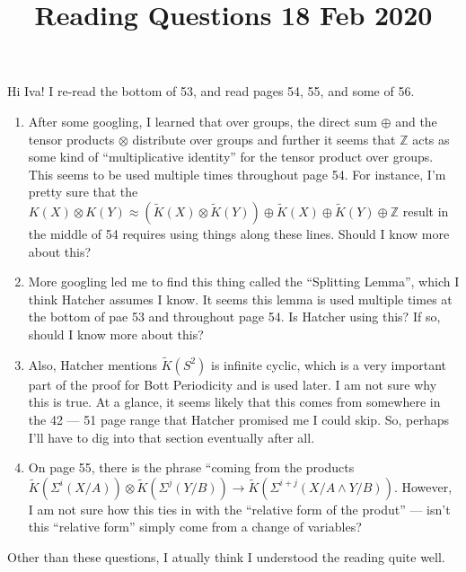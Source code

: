 \documentclass[12]{amsart}
\newcommand{\op}[0]{\oplus}
\newcommand{\ot}[0]{\otimes}
\newcommand{\RK}[0]{\tilde{K}}
\newcommand{\Z}[0]{\mathbb{Z}}
\newcommand{\ismt}[0]{\approx}
\begin{document}
\title{Reading Questions 18 Feb 2020}
\maketitle

Hi Iva! I re-read the bottom of 53, and read pages 54, 55, and some of 56.

\begin{enumerate}
    \item After some googling, I learned that over groups, the direct sum $\op$ and the tensor products $\ot$ distribute over groups and further it seems that $\Z$ acts as some kind of ``multiplicative identity'' for the tensor product over groups. This seems to be used multiple times throughout page 54. For instance, I'm pretty sure that the $K(X) \ot K(Y) \ismt (\RK(X) \ot \RK(Y)) \op \RK(X) \op \RK(Y) \op \Z$ result in the middle of 54 requires using things along these lines. Should I know more about this?
    \item More googling led me to find this thing called the ``Splitting Lemma'', which I think Hatcher assumes I know. It seems this lemma is used multiple times at the bottom of pae 53 and throughout page 54. Is Hatcher using this? If so, should I know more about this?
    \item Also, Hatcher mentions $\RK(S^2)$ is infinite cyclic, which is a very important part of the proof for Bott Periodicity and is used later. I am not sure why this is true. At a glance, it seems likely that this comes from somewhere in the 42 --- 51 page range that Hatcher promised me I could skip. So, perhaps I'll have to dig into that section eventually after all.
    \item On page 55, there is the phrase ``coming from the products $\RK(\Sigma^i(X/A)) \ot \RK(\Sigma^j(Y/B)) \rightarrow \RK(\Sigma^{i+j}(X/A \land Y/B))$. However, I am not sure how this ties in with the ``relative form of the produt'' --- isn't this ``relative form'' simply come from a change of variables?
\end{enumerate}

Other than these questions, I atually think I understood the reading quite well.
\end{document}
